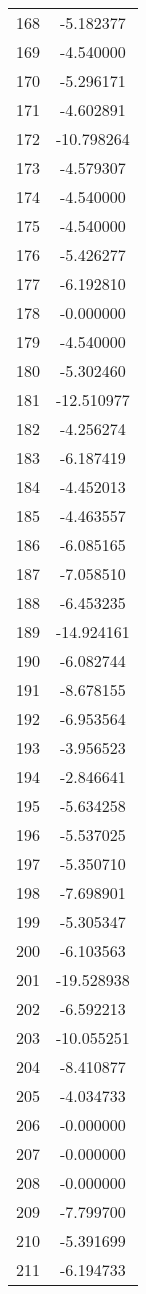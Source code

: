 \documentclass[12pt]{article}
\begin{document}
\begin{longtable}{@{}cc@{}}
168 & -5.182377 \\
169 & -4.540000 \\
170 & -5.296171 \\
171 & -4.602891 \\
172 & -10.798264 \\
173 & -4.579307 \\
174 & -4.540000 \\
175 & -4.540000 \\
176 & -5.426277 \\
177 & -6.192810 \\
178 & -0.000000 \\
179 & -4.540000 \\
180 & -5.302460 \\
181 & -12.510977 \\
182 & -4.256274 \\
183 & -6.187419 \\
184 & -4.452013 \\
185 & -4.463557 \\
186 & -6.085165 \\
187 & -7.058510 \\
188 & -6.453235 \\
189 & -14.924161 \\
190 & -6.082744 \\
191 & -8.678155 \\
192 & -6.953564 \\
193 & -3.956523 \\
194 & -2.846641 \\
195 & -5.634258 \\
196 & -5.537025 \\
197 & -5.350710 \\
198 & -7.698901 \\
199 & -5.305347 \\
200 & -6.103563 \\
201 & -19.528938 \\
202 & -6.592213 \\
203 & -10.055251 \\
204 & -8.410877 \\
205 & -4.034733 \\
206 & -0.000000 \\
207 & -0.000000 \\
208 & -0.000000 \\
209 & -7.799700 \\
210 & -5.391699 \\
211 & -6.194733 \\

\end{longtable}
\end{document}
